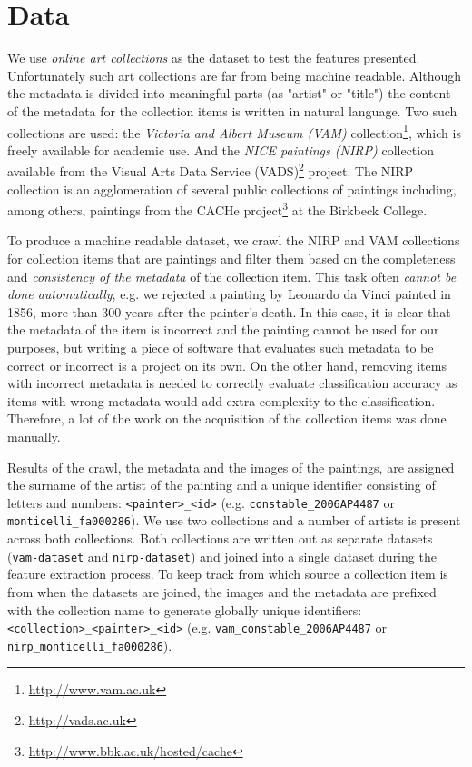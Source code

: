 \documentclass[11pt,a4paper,twoside,openright]{report}
\begin{document}

\clearpage{\pagestyle{empty}\cleardoublepage}
\chapter{Data}
\label{chap:data}

We use \emph{online art collections} as the dataset to test the features
presented.  Unfortunately such art collections are far from being machine
readable.  Although the metadata is divided into meaningful parts (as "artist"
or "title") the content of the metadata for the collection items is written in
natural language.  Two such collections are used: the \emph{Victoria and Albert
Museum (VAM)} collection\footnote{\href{http://www.vam.ac.uk/}
{http://www.vam.ac.uk}}, which is freely available for academic use.  And the
\emph{NICE paintings (NIRP)} collection available from the Visual Arts Data
Service (VADS)\footnote{\href{http://vads.ac.uk/}{http://vads.ac.uk}} project.
The NIRP collection is an agglomeration of several public collections of
paintings including, among others, paintings from the CACHe project\footnote{
\href{http://www.bbk.ac.uk/hosted/cache/}{http://www.bbk.ac.uk/hosted/cache}}
at the Birkbeck College.

To produce a machine readable dataset, we crawl the NIRP and VAM collections
for collection items that are paintings and filter them based on the
completeness and \emph{consistency of the metadata} of the collection item.
This task often \emph{cannot be done automatically}, e.g. we rejected a
painting by Leonardo da Vinci painted in 1856, more than 300 years after the
painter's death.  In this case, it is clear that the metadata of the item is
incorrect and the painting cannot be used for our purposes, but writing a piece
of software that evaluates such metadata to be correct or incorrect is a
project on its own.  On the other hand, removing items with incorrect metadata
is needed to correctly evaluate classification accuracy as items with wrong
metadata would add extra complexity to the classification.  Therefore, a lot of
the work on the acquisition of the collection items was done manually.

Results of the crawl, the metadata and the images of the paintings, are
assigned the surname of the artist of the painting and a unique identifier
consisting of letters and numbers: \texttt{<painter>\_<id>} (e.g.
\texttt{constable\_2006AP4487} or \texttt{monticelli\_fa000286}).  We use two
collections and a number of artists is present across both collections.  Both
collections are written out as separate datasets (\texttt{vam-dataset} and
\texttt{nirp-dataset}) and joined into a single dataset during the feature
extraction process.  To keep track from which source a collection item is from
when the datasets are joined, the images and the metadata are prefixed with the
collection name to generate globally unique identifiers:
\texttt{<collection>\_<painter>\_<id>} (e.g.
\texttt{vam\_constable\_2006AP4487} or \texttt{nirp\_monticelli\_fa000286}).
\end{document}
